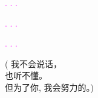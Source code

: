 \documentclass[11pt]{article}
\begin{document}
\begingroup
\begin{center}
\textcolor{magenta}{. . .} 
\end{center}
\endgroup

\begingroup
\begin{center}
\textcolor{magenta}{. . .} 
\end{center}
\endgroup

\begingroup
\begin{center}
\textcolor{magenta}{. . .} 
\end{center}
\endgroup

\vspace*{2\baselineskip}

\begingroup
\begin{center}
{\setmainfont{Source Han Serif SC}\selectfont
\textcolor{OliveGreen}{( 我不会说话，\\ \vspace*{2\baselineskip} 也听不懂。\\ \vspace*{2\baselineskip} 但为了你, 我会努力的。)}
}
\end{center}
\endgroup
\end{document}
